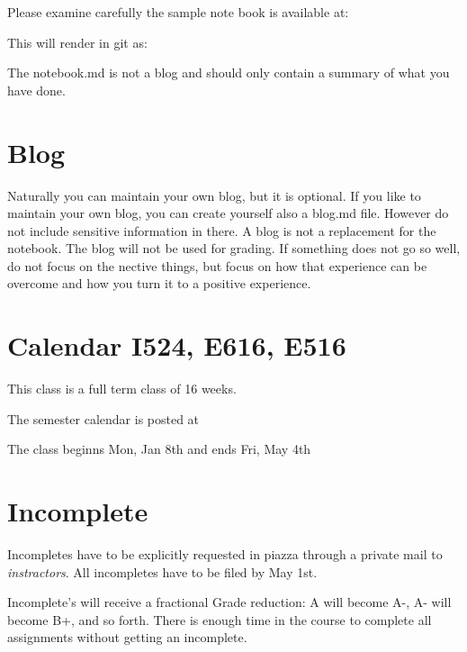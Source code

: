 Please examine carefully the sample note book is available at:


This will render in git as:


The notebook.md is not a blog and should only contain a summary of
what you have done. 

\section{Blog}

Naturally you can maintain your own blog, but it is optional. If you
like to maintain your own blog, you can create yourself also a blog.md
file. However do not include sensitive information in there. A blog is
not a replacement for the notebook. The blog will not be used for
grading. If something does not go so well, do not focus on the nective
things, but focus on how that experience can be overcome and how you
turn it to a positive experience.

\section{Calendar I524, E616, E516}\label{S:calendar}

This class is a full term class of 16 weeks.

\begin{IU}

The semester calendar is posted at 


The class beginns Mon, Jan 8th and ends Fri, May 4th

\end{IU}



\section{Incomplete}\label{incomplete}

Incompletes have to be explicitly requested in piazza through a
private mail to {\em instractors}. All incompletes have to be filed by
May 1st.

Incomplete's will receive a fractional Grade reduction: A will
become A-, A- will become B+, and so forth. There is enough time in the
course to complete all assignments without getting an incomplete.

